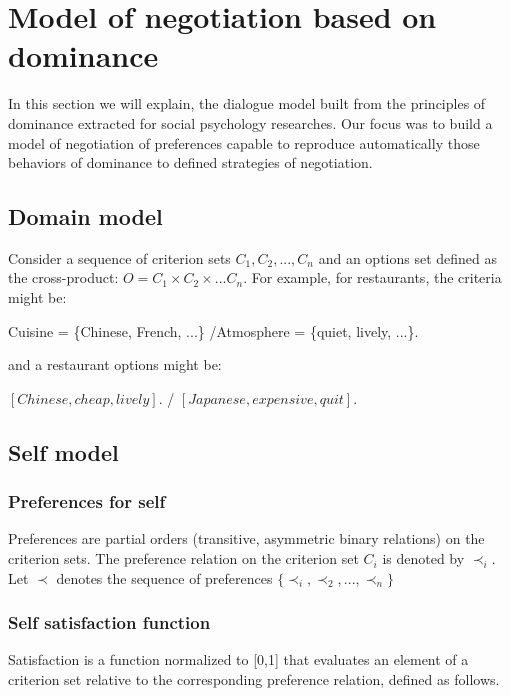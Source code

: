 \documentclass{llncs}
\begin{document}
	
	\section{Model of negotiation based on dominance}
	In this section we will explain, the dialogue model built from the principles of dominance extracted for social psychology researches. Our focus was to build a model of negotiation of preferences capable to reproduce automatically those behaviors of dominance to defined strategies of negotiation.

	\subsection{Domain model}
	Consider a sequence of criterion sets $C_1, C_2, ..., C_n$ and an options set defined as the cross-product:
	$O = C_1 \times C_2 \times \ldots C_n$.
	For example, for restaurants, the criteria might be:
	
	Cuisine = \{Chinese, French, ...\} /Atmosphere = \{quiet, lively, ...\}. 
	
	and a restaurant options might be: 
	
	$[Chinese, cheap, lively]$. / $[Japanese, expensive, quit]$.   
	\subsection{Self model} 
	
	\subsubsection{Preferences for self}
	Preferences are partial orders (transitive, asymmetric binary relations) on the criterion sets. The preference relation on the criterion set $C_i$ is denoted by $\prec_i$.			
	Let $\prec$ denotes the sequence of preferences $\{ \prec_i, \prec_2, ..., \prec_n\}$
	
	\subsubsection{Self satisfaction function} 
	
	Satisfaction is a function normalized to [0,1] that evaluates an element of a criterion set relative to the corresponding preference relation, defined as follows.
	
\end{document}
